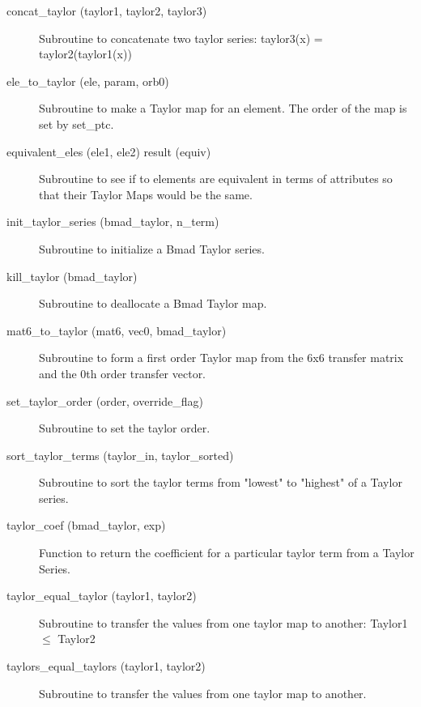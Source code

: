 \begin{description}

\item[concat_taylor (taylor1, taylor2, taylor3)] \Newline
Subroutine to concatenate two taylor series: taylor3(x) = taylor2(taylor1(x)) 

\item[ele_to_taylor (ele, param, orb0)] \Newline
Subroutine to make a Taylor map for an element. The order of the map is set by set_ptc.

\item[equivalent_eles (ele1, ele2) result (equiv)] \Newline 
Subroutine to see if to elements are equivalent in terms of attributes so
that their Taylor Maps would be the same. 

\item[init_taylor_series (bmad_taylor, n_term)] \Newline
Subroutine to initialize a Bmad Taylor series. 

\item[kill_taylor (bmad_taylor)] \Newline
Subroutine to deallocate a Bmad Taylor map. 

\item[mat6_to_taylor (mat6, vec0, bmad_taylor)] \Newline
Subroutine to form a first order Taylor map from the 6x6 transfer matrix 
and the 0th order transfer vector. 

\item[set_taylor_order (order, override_flag)] \Newline
Subroutine to set the taylor order. 

\item[sort_taylor_terms (taylor_in, taylor_sorted)] \Newline
Subroutine to sort the taylor terms from "lowest" to "highest" of a
Taylor series.

\item[taylor_coef (bmad_taylor, exp)] \Newline 
Function to return the coefficient for a particular taylor term from a
Taylor Series.

\item[taylor_equal_taylor (taylor1, taylor2)] \Newline
Subroutine to transfer the values from one taylor map to another:
Taylor1 $\le$ Taylor2

\item[taylors_equal_taylors (taylor1, taylor2)] \Newline 
Subroutine to transfer the values from one taylor map to another.


\end{description}
